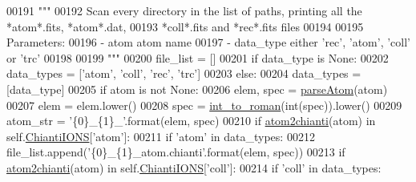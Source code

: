 \begin{DoxyCode}
00191         \textcolor{stringliteral}{"""}
00192 \textcolor{stringliteral}{        Scan every directory in the list of paths, printing all the *atom*.fits, *atom*.dat,}
00193 \textcolor{stringliteral}{            *coll*.fits and *rec*.fits files}
00194 \textcolor{stringliteral}{            }
00195 \textcolor{stringliteral}{        Parameters:}
00196 \textcolor{stringliteral}{           - atom        atom name}
00197 \textcolor{stringliteral}{           - data\_type   either 'rec', 'atom', 'coll' or 'trc'}
00198 \textcolor{stringliteral}{}
00199 \textcolor{stringliteral}{        """}
00200         file\_list = []
00201         \textcolor{keywordflow}{if} data\_type \textcolor{keywordflow}{is} \textcolor{keywordtype}{None}:
00202             data\_types = [\textcolor{stringliteral}{'atom'}, \textcolor{stringliteral}{'coll'}, \textcolor{stringliteral}{'rec'}, \textcolor{stringliteral}{'trc'}]
00203         \textcolor{keywordflow}{else}:
00204             data\_types = [data\_type]
00205         \textcolor{keywordflow}{if} atom \textcolor{keywordflow}{is} \textcolor{keywordflow}{not} \textcolor{keywordtype}{None}:
00206             elem, spec = \hyperlink{namespacepyneb_1_1utils_1_1misc_a8c069186002a3e73dd474958e35034d5}{parseAtom}(atom)
00207             elem = elem.lower()
00208             spec = \hyperlink{namespacepyneb_1_1utils_1_1misc_aec4e973d4cb9299f749ef190ea636a06}{int\_to\_roman}(int(spec)).lower()
00209             atom\_str = \textcolor{stringliteral}{'\{0\}\_\{1\}\_'}.format(elem, spec)
00210             \textcolor{keywordflow}{if} \hyperlink{namespacepyneb_1_1utils_1_1manage__atomic__data_a9c992b2ae01f2e369be5d539172f78a0}{atom2chianti}(atom) \textcolor{keywordflow}{in} self.\hyperlink{classpyneb_1_1utils_1_1manage__atomic__data_1_1___manage_atomic_data_a06491f5f808df3d4e58b35e09db74a18}{ChiantiIONS}[\textcolor{stringliteral}{'atom'}]:
00211                 \textcolor{keywordflow}{if} \textcolor{stringliteral}{'atom'} \textcolor{keywordflow}{in} data\_types:
00212                     file\_list.append(\textcolor{stringliteral}{'\{0\}\_\{1\}\_atom.chianti'}.format(elem, spec))
00213             \textcolor{keywordflow}{if} \hyperlink{namespacepyneb_1_1utils_1_1manage__atomic__data_a9c992b2ae01f2e369be5d539172f78a0}{atom2chianti}(atom) \textcolor{keywordflow}{in} self.\hyperlink{classpyneb_1_1utils_1_1manage__atomic__data_1_1___manage_atomic_data_a06491f5f808df3d4e58b35e09db74a18}{ChiantiIONS}[\textcolor{stringliteral}{'coll'}]:
00214                 \textcolor{keywordflow}{if} \textcolor{stringliteral}{'coll'} \textcolor{keywordflow}{in} data\_types:

\end{DoxyCode}

